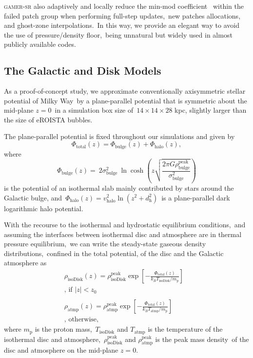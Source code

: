 \documentclass[twocolumn]{aastex631}
\begin{document}
  \textsc{gamer-sr} also adaptively and locally reduce the min-mod coefficient\
  \citep{tseng2021} within the failed patch group when performing full-step updates,\
  new patches allocations, and ghost-zone interpolations.\
  In this way, we provide an elegant way to avoid the use of pressure/density floor,\
  being unnatural but widely used in almost publicly available codes.\

  \subsection{The Galactic and Disk Models}
  As a proof-of-concept study, we approximate conventionally axisymmetric stellar potential of Milky Way\
  by a plane-parallel potential that is symmetric about the mid-plane $z=0$\
  in a simulation box size of\
  $14\times14\times28$ kpc, slightly larger than the size of eROISTA bubbles.

  The plane-parallel potential is fixed throughout our simulations and given by
  \begin{equation}
    \Phi_{\text{total}}(z) = \Phi_{\text{bulge}}(z) + \Phi_{\text{halo}}(z),
  \end{equation}
  where
  \begin{equation}
    \Phi_{\text{bulge}}(z)=\
    2\sigma^2_{\text{bulge}}\
    \ln\cosh\left(z\sqrt{\frac{2\pi G\rho_{\text{bulge}}^{\text{peak}}}{\sigma^2_{\text{bulge}}}}\right)
  \end{equation}
  is the potential of an isothermal slab mainly contributed by stars around the Galactic bulge, and\
  $\Phi_{\text{halo}}(z)=v^2_{\text{halo}}\ln\left(z^2+d^2_{\text{h}}\right)$\
  is a plane-parallel dark logarithmic halo potential.

  With the recourse to the isothermal and hydrostatic equilibrium conditions,\
  and assuming the interfaces between isothermal disc and atmosphere are in thermal pressure equilibrium,\
  we can write the steady-state gaseous density distributions,\
  confined in the total potential, of the disc and the Galactic atmosphere as\
  \begin{subequations}
  \begin{align}
     \displaystyle \rho_{\text{isoDisk}}(z) = \rho_{\text{isoDisk}}^{\text{peak}}
     \exp\left[-\frac{\Phi_{\text{total}}(z)}{k_{B}T_{\text{isoDisk}}/m_{\text{p}}}\right]&\label{isothermal-disc-density}\\
     \text{, if $|z| < z_{0}$}& \nonumber \\
     \nonumber\\
     \displaystyle \rho_{\text{atmp}}(z) = \rho_{\text{atmp}}^{\text{peak}}
     \exp\left[-\frac{\Phi_{\text{total}}(z)}{k_{B}T_{\text{atmp}}/m_{\text{p}}}\right]&\label{isothermal-atmp-density}\\
     \text{, otherwise,}& \nonumber
  \end{align}
  \label{disc-atm-sys}
  \end{subequations}
  where $m_{\text{p}}$ is the proton mass,\
  $T_{\text{isoDisk}}$ and $T_{\text{atmp}}$ is the temperature of the isothermal disc and atmosphere,\
  $\rho_{\text{isoDisk}}^{\text{peak}}$ and $\rho_{\text{atmp}}^{\text{peak}}$ is the peak mass density\
  of the disc and atmosphere on the mid-plane $z=0$.
\end{document}
